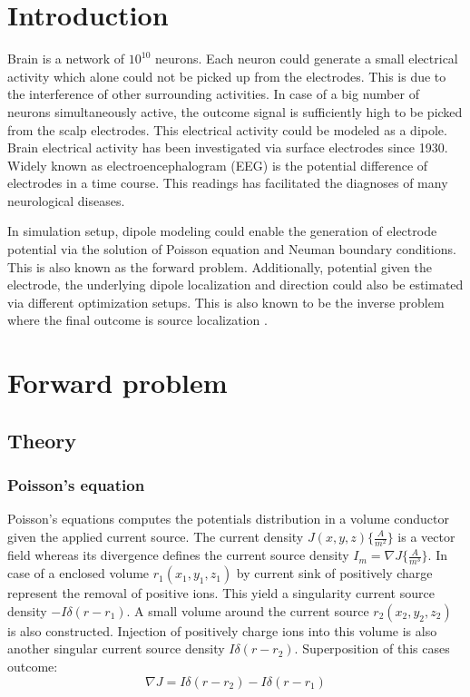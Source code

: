 \section{Introduction}

Brain is a network of $10^{10}$ neurons. Each neuron could generate a small electrical activity which alone could not be picked up from the electrodes. This is due to the interference of other surrounding activities. In case of a big number of neurons simultaneously active, the outcome signal is sufficiently high to be picked from the scalp electrodes. This electrical activity could be modeled as a dipole. Brain electrical activity has been investigated via surface electrodes since 1930. Widely known as electroencephalogram (EEG) is the potential difference of electrodes in a time course. This readings has facilitated the diagnoses of many neurological diseases. 

In simulation setup, dipole modeling could enable the generation of electrode potential via the solution of Poisson equation and Neuman boundary conditions. This is also known as the forward problem. Additionally, potential given the electrode, the underlying dipole localization and direction could also be estimated via different optimization setups. This is also known to be the inverse problem where the final outcome is source localization \cite{1}.

\section{Forward problem}

\subsection{Theory}
\subsubsection{Poisson's equation}

Poisson's equations computes the potentials distribution in a volume conductor given the applied current source. 
The current density $J(x,y,z)\big\{\frac{A}{m^2}\big\}$ is a vector field whereas its divergence defines the current source density $I_{m}=\nabla J\big\{\frac{A}{m^3}\big\}$. In case of a enclosed volume $r_{1}(x_{1},y_{1},z_{1})$ by current sink of positively charge represent the removal of positive ions. This yield a singularity current source density $-I\delta(r-r_{1})$. A small volume around the current source $r_{2}(x_{2},y_{2},z_{2})$ is also constructed. Injection of positively charge ions into this volume is also another singular current source density $I\delta(r-r_{2})$. Superposition of this cases outcome:
\begin{equation}\label{eq1}
   \nabla J= I\delta(r-r_{2})-I\delta(r-r_{1})
\end{equation}

